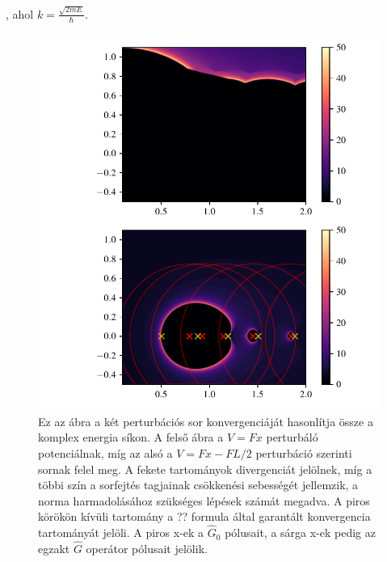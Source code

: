 , ahol $k = \frac{\sqrt{2mE}}{\hbar}$.
\begin{figure}[H]
	\centering
	\includegraphics[scale=1]{./figs/convergence3.pdf}
	\caption[Green-függvény perturbációs sorának konvergenciája]{Ez az ábra a két perturbációs sor konvergenciáját hasonlítja össze a komplex energia síkon. A felső ábra a $V=Fx$ perturbáló potenciálnak, míg az alsó a $V = Fx-FL/2$ perturbáció szerinti sornak felel meg. A fekete tartományok divergenciát jelölnek, míg a többi szín a sorfejtés tagjainak csökkenési sebességét jellemzik, a norma harmadolásához szükséges lépések számát megadva. A piros körökön kívüli tartomány a ?? formula által garantált konvergencia tartományát jelöli. A piros x-ek a $\hat{G}_0$ pólusait, a sárga x-ek pedig az egzakt $\hat{G}$ operátor pólusait jelölik.}
\end{figure}